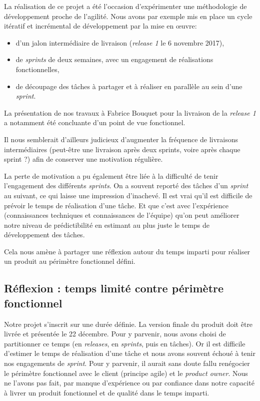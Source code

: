 \documentclass[a4paper,12pt]{article}
\begin{document}
La réalisation de ce projet a été l'occasion d'expérimenter une méthodologie de développement proche de l'agilité.
Nous avons par exemple mis en place un cycle itératif et incrémental de développement par la mise en œuvre:
\begin{itemize}
\item d'un jalon intermédiaire de livraison (\emph{release 1} le 6 novembre 2017),
\item de \emph{sprints} de deux semaines, avec un engagement de réalisations fonctionnelles,
\item de découpage des tâches à partager et à réaliser en parallèle au sein d'une \emph{sprint}.
\end{itemize} 
La présentation de nos travaux à Fabrice Bouquet pour la livraison de la \emph{release 1} a notamment été concluante d'un point de vue fonctionnel.

Il nous semblerait d'ailleurs judicieux d'augmenter la fréquence de livraisons intermédiaires (peut-être une livraison après deux sprints, voire après chaque sprint ?) afin de conserver une motivation régulière.

La perte de motivation a pu également être liée à la difficulté de tenir l'engagement des différents \emph{sprints}. On a souvent reporté des tâches d'un \emph{sprint} au suivant, ce qui laisse une impression d'inachevé. Il est vrai qu'il est difficile de prévoir le temps de réalisation d'une tâche. Et que c'est avec l'expérience (connaissances techniques et connaissances de l'équipe) qu'on peut améliorer notre niveau de prédictibilité en estimant au plus juste le temps de développement des tâches.

Cela nous amène à partager une réflexion autour du temps imparti pour réaliser un produit au périmètre fonctionnel défini.

\subsection{Réflexion : temps limité contre périmètre fonctionnel}

Notre projet s'inscrit sur une durée définie. La version finale du produit doit être livrée et présentée le 22 décembre. 
Pour y parvenir, nous avons choisi de partitionner ce temps (en \emph{releases}, en \emph{sprints}, puis en tâches). 
Or il est difficile d'estimer le temps de réalisation d'une tâche et nous avons souvent échoué à tenir nos engagements de \emph{sprint}. Pour y parvenir, il aurait sans doute fallu renégocier le périmètre fonctionnel avec le client (principe agile) et le \emph{product owner}. Nous ne l'avons pas fait, par manque d'expérience ou par confiance dans notre capacité à livrer un produit fonctionnel et de qualité dans le temps imparti.
\end{document}
